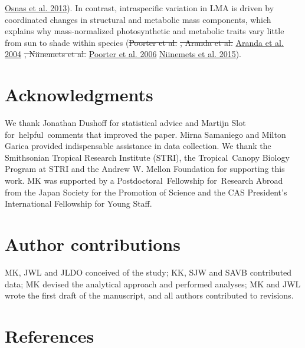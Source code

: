\documentclass[
  12pt,
]{article}
\providecommand{\DIFaddtex}[1]{{\protect\color{blue}\uwave{#1}}} %
\providecommand{\DIFdeltex}[1]{{\protect\color{red}\sout{#1}}}                      %
\providecommand{\DIFaddbegin}{} %
\providecommand{\DIFaddend}{} %
\providecommand{\DIFdelbegin}{} %
\providecommand{\DIFdelend}{} %
\providecommand{\DIFadd}[1]{\texorpdfstring{\DIFaddtex{#1}}{#1}} %
\providecommand{\DIFdel}[1]{\texorpdfstring{\DIFdeltex{#1}}{}} %
\newcommand{\DIFscaledelfig}{0.5}
\newlength{\DIFdelgraphicswidth} %
\newlength{\DIFdelgraphicsheight} %
\newcommand{\DIFaddincludegraphics}[2][]{{\color{blue}\fbox{\DIFOincludegraphics[#1]{#2}}}} %
\newcommand{\DIFdelincludegraphics}[2][]{%
\sbox{\DIFdelgraphicsbox}{\DIFOincludegraphics[#1]{#2}}%
\settoboxwidth{\DIFdelgraphicswidth}{\DIFdelgraphicsbox} %
\settoboxtotalheight{\DIFdelgraphicsheight}{\DIFdelgraphicsbox} %
\scalebox{\DIFscaledelfig}{%
\parbox[b]{\DIFdelgraphicswidth}{\usebox{\DIFdelgraphicsbox}\\[-\baselineskip] \rule{\DIFdelgraphicswidth}{0em}}\llap{\resizebox{\DIFdelgraphicswidth}{\DIFdelgraphicsheight}{%
\setlength{\unitlength}{\DIFdelgraphicswidth}%
\begin{picture}(1,1)%
\thicklines\linethickness{2pt} %
{\color[rgb]{1,0,0}\put(0,0){\framebox(1,1){}}}%
{\color[rgb]{1,0,0}\put(0,0){\line( 1,1){1}}}%
{\color[rgb]{1,0,0}\put(0,1){\line(1,-1){1}}}%
\end{picture}%
}\hspace*{3pt}}} %
} %
\DeclareRobustCommand{\DIFaddbegin}{\DIFOaddbegin \let\includegraphics\DIFaddincludegraphics} %
\DeclareRobustCommand{\DIFaddend}{\DIFOaddend \let\includegraphics\DIFOincludegraphics} %
\DeclareRobustCommand{\DIFdelbegin}{\DIFOdelbegin \let\includegraphics\DIFdelincludegraphics} %
\DeclareRobustCommand{\DIFdelend}{\DIFOaddend \let\includegraphics\DIFOincludegraphics} %
\begin{document}
\DIFdelend \DIFaddbegin \hyperlink{ref-Osnas2013}{Osnas et al. 2013}\DIFaddend ).
In contrast, intraspecific variation in LMA is driven by coordinated changes in structural and metabolic mass components, which explains why mass-normalized photosynthetic and metabolic traits vary little from sun to shade within species (\DIFdelbegin \DIFdel{Poorter et al. }\DIFdelend \protect\DIFdelbegin %
\DIFdel{, Aranda et al. }\DIFdelend \DIFaddbegin \hyperlink{ref-Aranda2004}{Aranda et al. 2004}\DIFadd{, }\DIFaddend \protect\DIFdelbegin %
\DIFdel{, Niinemets et al. }\DIFdelend \DIFaddbegin \hyperlink{ref-Poorter2006b}{Poorter et al. 2006}\DIFadd{, }\DIFaddend \protect\DIFdelbegin %
\DIFdelend \DIFaddbegin \hyperlink{ref-Niinemets2015}{Niinemets et al. 2015}\DIFaddend ).

\hypertarget{acknowledgments}{%
\section{Acknowledgments}\label{acknowledgments}}

We thank Jonathan Dushoff for statistical advice and Martijn Slot for~helpful~comments that improved the paper.
Mirna Samaniego and Milton Garica provided indispensable assistance in data collection.
We thank the Smithsonian Tropical Research Institute (STRI), the Tropical~Canopy Biology Program at STRI and the Andrew W. Mellon Foundation for supporting this work. MK was supported by a Postdoctoral~Fellowship for~Research Abroad from the Japan Society for the Promotion of Science and the CAS President's International Fellowship for Young Staff.

\hypertarget{author-contributions}{%
\section{Author contributions}\label{author-contributions}}

MK, JWL and JLDO conceived of the study; KK, SJW and SAVB contributed data; MK devised the analytical approach and performed analyses; MK and JWL wrote the first draft of the manuscript, and all authors contributed to revisions.

\hypertarget{references}{%
\section{References}\label{references}}
\end{document}
